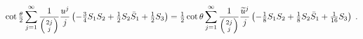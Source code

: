 \begin{equation}
\cot \tfrac{\theta}{2}
\sum_{j=1}^{\infty} \frac{1}{\left(2j\atop j\right)}\frac{u^j}{j}
\left( -\tfrac{3}{4}S_1 S_2 + \tfrac{1}{2}S_2 \bar{S}_1
+\tfrac{1}{2}S_3 \right)
=\tfrac{1}{2} 
\cot \theta
\sum_{j=1}^{\infty} \frac{1}{\left(2j\atop j\right)}
\frac{{\widetilde{u}}^j}{j} 
\left( -\tfrac{1}{8}S_1 S_2 + \tfrac{1}{8}S_2 \bar{S}_1
+\tfrac{1}{16}S_3 \right)\; .
\end{equation}

